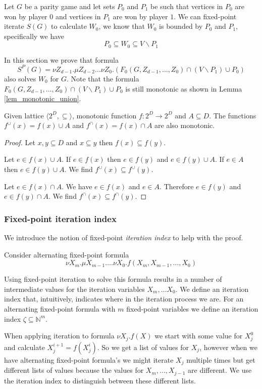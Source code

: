 Let $G$ be a parity game and let sets $P_0$ and $P_1$ be such that vertices in $P_0$ are won by player $0$ and vertices in $P_1$ are won by player $1$. We can fixed-point iterate $S(G)$ to calculate $W_0$, we know that $W_0$ is bounded by $P_0$ and $P_1$, specifically we have
\[ P_0 \subseteq W_0 \subseteq V\backslash P_1\]

In this section we prove that formula 
\[ S^P(G) = \nu Z_{d-1}.\mu Z_{d-2}\dots \nu Z_0.(F_0(G,Z_{d-1},\dots,Z_0) \cap (V\backslash P_1) \cup P_0) \]
also solves $W_0$ for $G$. Note that the formula $F_0(G,Z_{d-1},\dots,Z_0) \cap (V\backslash P_1) \cup P_0$ is still monotonic as shown in Lemma \ref{lem_monotonic_union}.
\begin{lemma}
	\label{lem_monotonic_union}
	Given lattice $\langle 2^D, \subseteq \rangle $, monotonic function $f :  2^D \rightarrow 2^D$ and $A \subseteq D$. The functions $f^\cup(x) = f(x) \cup A$ and $f^\cap(x) = f(x) \cap A$ are also monotonic.
	\begin{proof}
		Let $x,y \subseteq D$ and $x\subseteq y$ then $f(x) \subseteq f(y)$.
		
		Let $e \in f(x) \cup A$. If $e \in f(x)$ then $e \in f(y)$ and $e \in f(y) \cup A$. If $e \in A$ then $e \in f(y) \cup A$. We find $f^\cup(x) \subseteq f^\cup(y)$.
		
		Let $e \in f(x) \cap A$. We have $e \in f(x)$ and $e \in A$. Therefore $e \in f(y)$ and $e \in f(y) \cap A$. We find $f^\cap(x) \subseteq f^\cap(y)$.
	\end{proof}
\end{lemma}

\subsubsection{Fixed-point iteration index} We introduce the notion of fixed-point \textit{iteration index} to help with the proof.

Consider alternating fixed-point formula
\[ \nu X_m.\mu X_{m-1}\dots.\nu X_0.f(X_m,X_{m-1},\dots,X_0) \]

Using fixed-point iteration to solve this formula results in a number of intermediate values for the iteration variables $X_m,\dots X_0$. We define an iteration index that, intuitively, indicates where in the iteration process we are. For an alternating fixed-point formula with $m$ fixed-point variables we define an iteration index $\zeta \subseteq \mathbb{N}^m$.

When applying iteration to formula $\nu X_j.f(X)$ we start with some value for $X_j^0$ and calculate $X_j^{i+1} = f(X_j^{i})$. So we get a list of values for $X_j$, however when we have alternating fixed-point formula's we might iterate $X_j$ multiple times but get different lists of values because the values for $X_m,\dots,X_{j-1}$ are different. We use the iteration index to distinguish between these different lists. 

